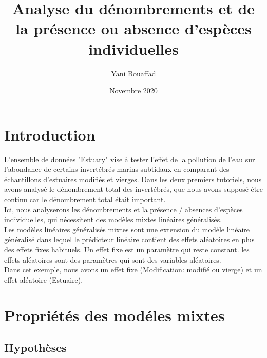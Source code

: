 \documentclass{article}
\title{Analyse du dénombrements et de la présence ou absence d'espèces individuelles}
\author{Yani Bouaffad}
\date{Novembre 2020}
\theoremstyle{definition}
\begin{document}
\maketitle

\vspace{1cm}

\section*{Introduction}

L'ensemble de données "Estuary" vise à tester l'effet de la pollution de l'eau sur l'abondance de certains invertébrés marins subtidaux en comparant des échantillons d'estuaires modifiés et vierges. Dans les deux premiers tutoriels, nous avons analysé le dénombrement total des invertébrés, que nous avons supposé être continu car le dénombrement total était important. \\
Ici, nous analyserons les dénombrements et la présence / absences d'espèces individuelles, qui nécessitent des modèles mixtes linéaires généralisés. \\
Les modèles linéaires généralisés mixtes sont une extension du modèle linéaire généralisé dans lequel le prédicteur linéaire contient des effets aléatoires en plus des effets fixes habituels. 
Un effet fixe est un paramètre qui reste constant.
les effets aléatoires sont des paramètres qui sont des variables aléatoires.
\\

Dans cet exemple, nous avons un effet fixe (Modification: modifié ou vierge) et un effet aléatoire (Estuaire). 




\newpage

\section{Propriétés des modéles mixtes}

\vspace{1cm}

\subsection{Hypothèses}
\end{document}

